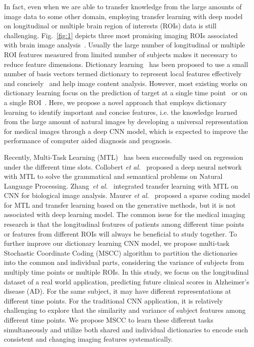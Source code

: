 \documentclass[10pt,twocolumn,letterpaper]{article}
\begin{document}
In fact, even when we are able to transfer knowledge from the large amounts of image data to some other domain, employing transfer learning with deep model on longitudinal or multiple brain region of interests (ROIs) data is still challenging. Fig.~\ref{fig:1} depicts three most promising imaging ROIs associated with brain image analysis~\cite{thompson:natrev10}. 
Usually the large number of longitudinal or multiple ROI features measured from limited number of subjects makes it necessary to reduce feature dimensions. Dictionary learning~\cite{mairal2009online, lin2014stochastic} has been proposed to use a small number of basis vectors termed dictionary to represent local features effectively and concisely~\cite{donoho2003optimally} and help image content analysis. However, most existing works on dictionary learning  focus on the prediction of target at a single time point~\cite{mairal2009online} or on a single ROI~\cite{zhang2016hyperbolic, zhang2016applying}.
Here, we propose a novel approach that employs dictionary learning to identify important and concise features, i.e. the knowledge learned from the large amount of natural images by developing a universal representation for medical images through a deep CNN model, which is expected to improve the performance of computer aided diagnosis and prognosis.

Recently, Multi-Task Learning (MTL)~\cite{wang2015classification,zhang2012multi,zhou2013modeling, wang2014highly} has been successfully used on regression under the different time slots. Collobert \emph{et al.}~\cite{collobert2008unified} proposed a deep neural network with MTL to solve the grammatical and semantical problems on Natural Language Processing. Zhang~\emph{et al.}~\cite{zhang2015deep} integrated transfer learning with MTL on CNN for biological image analysis. Maurer \emph{et al.}~\cite{maurer2013sparse} proposed a sparse coding model for MTL and transfer learning based on the generative methods, but it is not associated with deep learning model. The common issue for the medical imaging research is that the longitudinal features of patients among different time points or features from different ROIs will always be beneficial to study together. To further improve our dictionary learning CNN model, we propose multi-task Stochastic Coordinate Coding (MSCC) algorithm to partition the dictionaries into the common and individual parts, considering the variance of subjects from multiply time points or multiple ROIs. In this study, we focus on the longitudinal dataset of a real world application, predicting future clinical scores in Alzheimer’s disease (AD). For the same subject, it may have different representations at different time points. For the traditional CNN application, it is relatively challenging to explore that the similarity and variance of subject features among different time points. We propose MSCC to learn these different tasks simultaneously and utilize both shared and individual dictionaries to encode such consistent and changing imaging features systematically.
\end{document}
